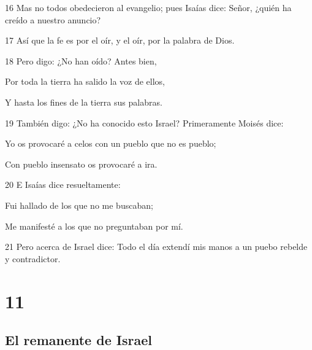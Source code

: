 \par 16 Mas no todos obedecieron al evangelio; pues Isaías dice: Señor, ¿quién ha creído a nuestro anuncio?
\par 17 Así que la fe es por el oír, y el oír, por la palabra de Dios.
\par 18 Pero digo: ¿No han oído? Antes bien,
\par Por toda la tierra ha salido la voz de ellos,
\par Y hasta los fines de la tierra sus palabras.
\par 19 También digo: ¿No ha conocido esto Israel? Primeramente Moisés dice:
\par Yo os provocaré a celos con un pueblo que no es pueblo;
\par Con pueblo insensato os provocaré a ira.
\par 20 E Isaías dice resueltamente:
\par Fui hallado de los que no me buscaban;
\par Me manifesté a los que no preguntaban por mí.
\par 21 Pero acerca de Israel dice: Todo el día extendí mis manos a un puebo rebelde y contradictor.

\chapter{11}

\section*{El remanente de Israel}

